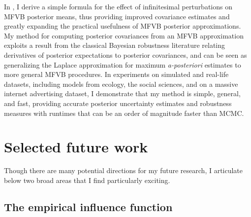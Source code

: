 In \citet{giordano:2015:linear, giordano:2018:covariances}, I derive a simple
formula for the effect of infinitesimal perturbations on MFVB posterior means,
thus providing improved covariance estimates and greatly expanding the practical
usefulness of MFVB posterior approximations. My method for computing posterior
covariances from an MFVB approximation exploits a result from the classical
Bayesian robustness literature relating derivatives of posterior expectations to
posterior covariances, and can be seen as generalizing the Laplace approximation
for maximum \emph{a-posteriori} estimates to more general MFVB procedures.
In experiments on simulated and real-life datasets,  including models from
ecology, the social sciences,
and on a massive internet advertising dataset, I
demonstrate that my method is simple, general, and fast, providing accurate
posterior uncertainty estimates and robustness measures with runtimes that can
be an order of magnitude faster than MCMC.



\section{Selected future work}


Though there are many potential directions for my future research, I articulate
below two broad areas that I find particularly exciting.

\subsection{The empirical influence function}

